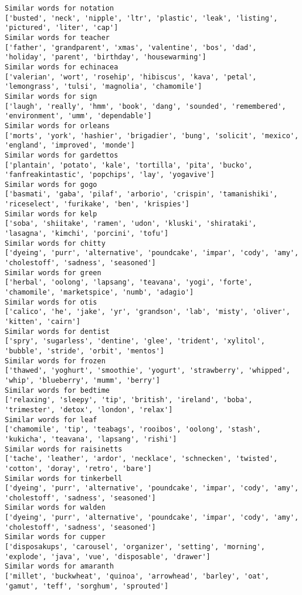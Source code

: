 \documentclass[11pt]{article}
\begin{document}
\begin{Verbatim}[commandchars=\\\{\}]
Similar words for notation
['busted', 'neck', 'nipple', 'ltr', 'plastic', 'leak', 'listing', 'pictured', 'liter', 'cap']
Similar words for teacher
['father', 'grandparent', 'xmas', 'valentine', 'bos', 'dad', 'holiday', 'parent', 'birthday', 'housewarming']
Similar words for echinacea
['valerian', 'wort', 'rosehip', 'hibiscus', 'kava', 'petal', 'lemongrass', 'tulsi', 'magnolia', 'chamomile']
Similar words for sign
['laugh', 'really', 'hmm', 'book', 'dang', 'sounded', 'remembered', 'environment', 'umm', 'dependable']
Similar words for orleans
['morts', 'york', 'hashier', 'brigadier', 'bung', 'solicit', 'mexico', 'england', 'improved', 'monde']
Similar words for gardettos
['plantain', 'potato', 'kale', 'tortilla', 'pita', 'bucko', 'fanfreakintastic', 'popchips', 'lay', 'yogavive']
Similar words for gogo
['basmati', 'gaba', 'pilaf', 'arborio', 'crispin', 'tamanishiki', 'riceselect', 'furikake', 'ben', 'krispies']
Similar words for kelp
['soba', 'shiitake', 'ramen', 'udon', 'kluski', 'shirataki', 'lasagna', 'kimchi', 'porcini', 'tofu']
Similar words for chitty
['dyeing', 'purr', 'alternative', 'poundcake', 'impar', 'cody', 'amy', 'cholestoff', 'sadness', 'seasoned']
Similar words for green
['herbal', 'oolong', 'lapsang', 'teavana', 'yogi', 'forte', 'chamomile', 'marketspice', 'numb', 'adagio']
Similar words for otis
['calico', 'he', 'jake', 'yr', 'grandson', 'lab', 'misty', 'oliver', 'kitten', 'cairn']
Similar words for dentist
['spry', 'sugarless', 'dentine', 'glee', 'trident', 'xylitol', 'bubble', 'stride', 'orbit', 'mentos']
Similar words for frozen
['thawed', 'yoghurt', 'smoothie', 'yogurt', 'strawberry', 'whipped', 'whip', 'blueberry', 'mumm', 'berry']
Similar words for bedtime
['relaxing', 'sleepy', 'tip', 'british', 'ireland', 'boba', 'trimester', 'detox', 'london', 'relax']
Similar words for leaf
['chamomile', 'tip', 'teabags', 'rooibos', 'oolong', 'stash', 'kukicha', 'teavana', 'lapsang', 'rishi']
Similar words for raisinetts
['tache', 'leather', 'ardor', 'necklace', 'schnecken', 'twisted', 'cotton', 'doray', 'retro', 'bare']
Similar words for tinkerbell
['dyeing', 'purr', 'alternative', 'poundcake', 'impar', 'cody', 'amy', 'cholestoff', 'sadness', 'seasoned']
Similar words for walden
['dyeing', 'purr', 'alternative', 'poundcake', 'impar', 'cody', 'amy', 'cholestoff', 'sadness', 'seasoned']
Similar words for cupper
['disposakups', 'carousel', 'organizer', 'setting', 'morning', 'explode', 'java', 'vue', 'disposable', 'drawer']
Similar words for amaranth
['millet', 'buckwheat', 'quinoa', 'arrowhead', 'barley', 'oat', 'gamut', 'teff', 'sorghum', 'sprouted']

\end{Verbatim}
\end{document}
